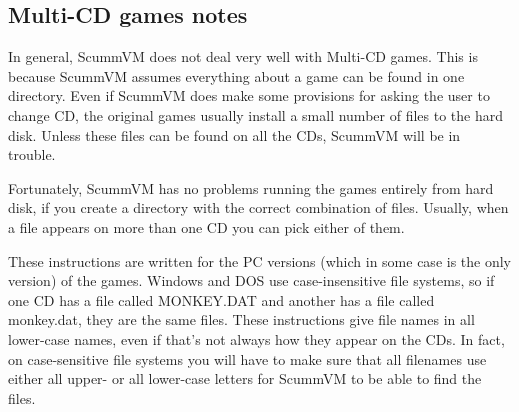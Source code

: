 


\subsection{Multi-CD games notes}

In general, ScummVM does not deal very well with Multi-CD games. This is
because ScummVM assumes everything about a game can be found in one directory.
Even if ScummVM does make some provisions for asking the user to change CD, the
original games usually install a small number of files to the hard disk. Unless
these files can be found on all the CDs, ScummVM will be in trouble.

Fortunately, ScummVM has no problems running the games entirely from hard disk,
if you create a directory with the correct combination of files. Usually, when
a file appears on more than one CD you can pick either of them.

These instructions are written for the PC versions (which in some case is the
only version) of the games. Windows and DOS use case-insensitive file systems,
so if one CD has a file called MONKEY.DAT and another has a file called
monkey.dat, they are the same files. These instructions give file names in all
lower-case names, even if that's not always how they appear on the CDs. In
fact, on case-sensitive file systems you will have to make sure that all
filenames use either all upper- or all lower-case letters for ScummVM to be
able to find the files.
